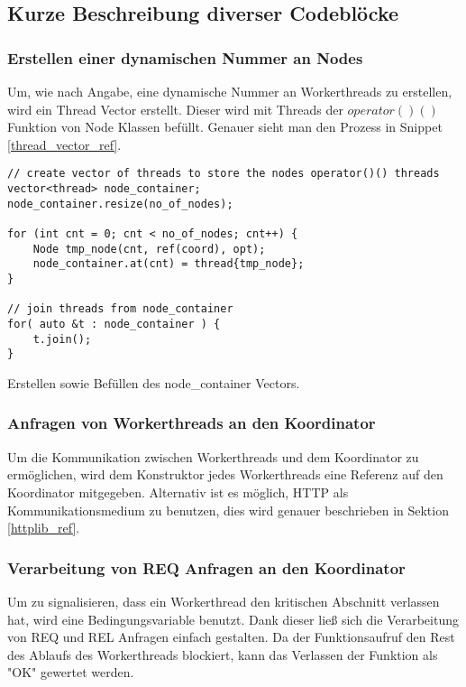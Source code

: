 \documentclass[12pt, letterpaper]{article}
\newenvironment{code}{\captionsetup{type=listing}}{}
\begin{document}
\subsection{Kurze Beschreibung diverser Codeblöcke}

\subsubsection{Erstellen einer dynamischen Nummer an Nodes}
Um, wie nach Angabe, eine dynamische Nummer an Workerthreads zu erstellen, wird ein Thread Vector erstellt. Dieser wird mit Threads der $operator()()$ Funktion von Node Klassen befüllt.
Genauer sieht man den Prozess in Snippet \ref{thread_vector_ref}.

\begin{code}
\begin{verbatim}
// create vector of threads to store the nodes operator()() threads
vector<thread> node_container;
node_container.resize(no_of_nodes);

for (int cnt = 0; cnt < no_of_nodes; cnt++) {
    Node tmp_node(cnt, ref(coord), opt);
    node_container.at(cnt) = thread{tmp_node};
}

// join threads from node_container
for( auto &t : node_container ) {
    t.join();
}
\end{verbatim}
\caption{Erstellen sowie Befüllen des node\_container Vectors.}
\label{thread_vector_ref}
\end{code}

\subsubsection{Anfragen von Workerthreads an den Koordinator}
Um die Kommunikation zwischen Workerthreads und dem Koordinator zu ermöglichen, wird dem Konstruktor jedes Workerthreads eine Referenz auf den Koordinator mitgegeben. 
Alternativ ist es möglich, HTTP als Kommunikationsmedium zu benutzen, dies wird genauer beschrieben in Sektion \ref{httplib_ref}.

\subsubsection{Verarbeitung von REQ Anfragen an den Koordinator}

Um zu signalisieren, dass ein Workerthread den kritischen Abschnitt verlassen hat, wird eine Bedingungsvariable benutzt. Dank dieser ließ sich die Verarbeitung von REQ und REL Anfragen einfach gestalten.
Da der Funktionsaufruf den Rest des Ablaufs des Workerthreads blockiert, kann das Verlassen der Funktion als "OK" gewertet werden.
\end{document}
